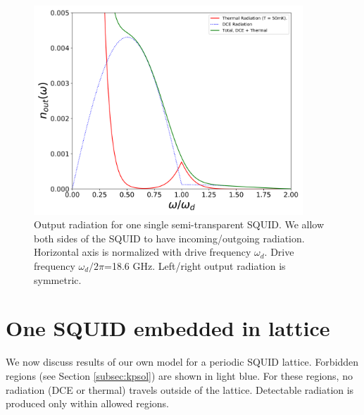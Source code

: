 \clearpage
%
\begin{figure}[h]
    \includegraphics[width=0.9\textwidth, keepaspectratio]{figures/results/single_SQUID.png}
    \caption{Output radiation for one single semi-transparent SQUID. We allow both sides of the SQUID to have incoming/outgoing radiation. Horizontal axis is normalized with drive frequency $\omega_d$. Drive frequency $\omega_d / 2\pi$=18.6 GHz. Left/right output radiation is symmetric.}
    \label{fig:naked_SQUID}
\end{figure}
%
\clearpage
\newpage
\section{One SQUID embedded in lattice}\label{sec:results_one_active}
We now discuss results of our own model for a periodic SQUID lattice. Forbidden regions (see Section \ref{subsec:kpsol}) are shown in light blue. For these regions, no radiation (DCE or thermal) travels outside of the lattice. Detectable radiation is produced only within allowed regions.

